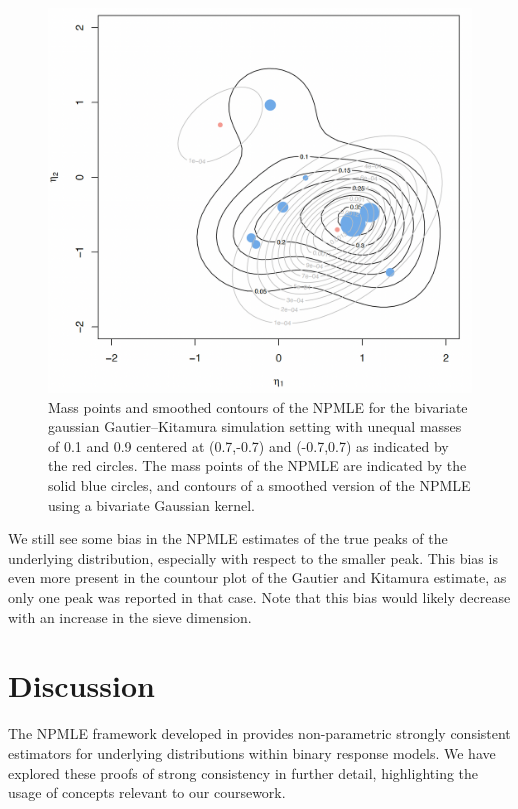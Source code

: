 \documentclass[11pt]{article}
\begin{document}
\begin{figure}[H]
\centering
\includegraphics[scale = 0.5]{KW1_new.png}
\caption{Mass points and smoothed contours of the NPMLE for the bivariate gaussian Gautier–Kitamura simulation setting with unequal masses of 0.1 and 0.9 centered at (0.7,-0.7) and (-0.7,0.7) as indicated by the red circles. The mass points of the NPMLE are indicated by the solid blue circles, and contours of a smoothed version of the NPMLE using a bivariate Gaussian kernel.}
\end{figure}

We still see some bias in the NPMLE estimates of the true peaks of the underlying distribution, especially with respect to the smaller peak. This bias is even more present in the countour plot of the Gautier and Kitamura estimate, as only one peak was reported in that case. Note that this bias would likely decrease with an increase in the sieve dimension.

\section{Discussion}

The NPMLE framework developed in \cite{NPMLE} provides non-parametric strongly consistent estimators for underlying distributions within binary response models. We have explored these proofs of strong consistency in further detail, highlighting the usage of concepts relevant to our coursework.  
\end{document}
